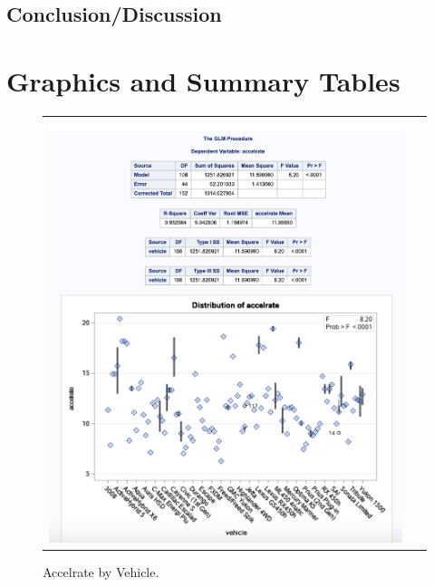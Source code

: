 \documentclass[acmsmall]{acmart}
\begin{document}
\subsection{Conclusion/Discussion}
\pagebreak
\appendix{} 
\section{Graphics and Summary Tables}
\begin{figure}[H] %
	\centering
	\begin{tabular}{| p{}|}
	\hline
	\\
	\includegraphics[width=0.95\textwidth]{../graphics/AccelrateByVehicle}\\
	\hline
	\end{tabular}	
	\caption{Accelrate by Vehicle.} %
	\label{fig:ABV}
\end{figure}
\end{document}
